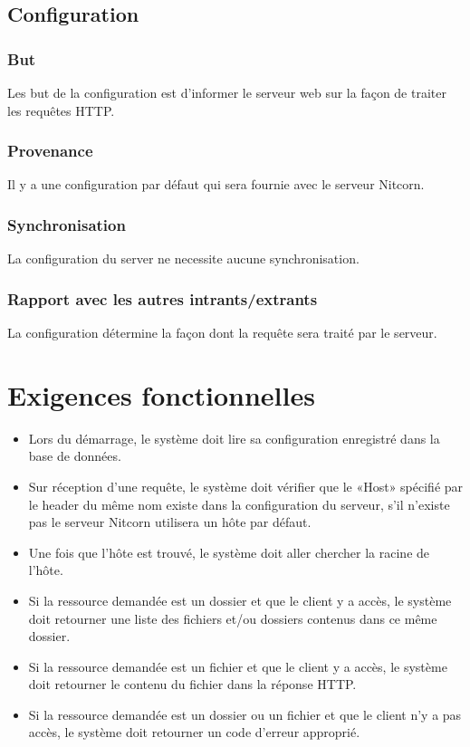 \documentclass{scrreprt}
\begin{document}
\subsection{Configuration}
\subsubsection{But} Les but de la configuration est d'informer le serveur web sur la façon de traiter les requêtes HTTP.
\subsubsection{Provenance} Il y a une configuration par défaut qui sera fournie avec le serveur Nitcorn. 
\subsubsection{Synchronisation} La configuration du server ne necessite aucune synchronisation.
\subsubsection{Rapport avec les autres intrants/extrants} La configuration détermine la façon dont la requête sera traité par le serveur.
\section{Exigences fonctionnelles}
\begin{itemize}
    \item Lors du démarrage, le système doit lire sa configuration enregistré dans la base de données.
    \item Sur réception d'une requête, le système doit vérifier que le «Host» spécifié par le header du même nom existe dans la configuration du serveur, s'il n'existe pas
        le serveur Nitcorn utilisera un hôte par défaut.
    \item Une fois que l'hôte est trouvé, le système doit aller chercher la racine de l'hôte.
    \item Si la ressource demandée est un dossier et que le client y a accès, le système doit retourner une liste des fichiers et/ou dossiers contenus dans ce même dossier.
    \item Si la ressource demandée est un fichier et que le client y a accès, le système doit retourner le contenu du fichier dans la réponse HTTP.
    \item Si la ressource demandée est un dossier ou un fichier et que le client n'y a pas accès, le système doit retourner un code d'erreur approprié.
\end{itemize}
\end{document}
